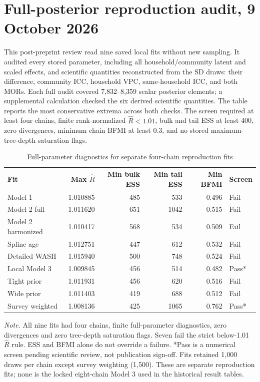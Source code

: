 \documentclass[10pt]{article}
\begin{document}
\section{Full-posterior reproduction audit, 9 October 2026}

This post-preprint review read nine saved local fits without new sampling. It audited every stored parameter, including all household/community latent and scaled effects, and scientific quantities reconstructed from the SD draws: their difference, community ICC, household VPC, same-household ICC, and both MORs. Each full audit covered 7,832--8,359 scalar posterior elements; a supplemental calculation checked the six derived scientific quantities. The table reports the most conservative extrema across both checks. The screen required at least four chains, finite rank-normalized $\hat R<1.01$, bulk and tail ESS at least 400, zero divergences, minimum chain BFMI at least 0.3, and no stored maximum-tree-depth saturation flags.

\begin{table}[H]
\centering
\caption{Full-parameter diagnostics for separate four-chain reproduction fits}
\label{tab:full_posterior_audit}
\small
\begin{tabular}{lrrrrl}
\toprule
Fit & Max $\hat R$ & Min bulk ESS & Min tail ESS & Min BFMI & Screen \\
\midrule
Model 1 & 1.010885 & 485 & 533 & 0.496 & Fail \\
Model 2 full & 1.011620 & 651 & 1042 & 0.515 & Fail \\
Model 2 harmonized & 1.010417 & 568 & 534 & 0.509 & Fail \\
Spline age & 1.012751 & 447 & 612 & 0.532 & Fail \\
Detailed WASH & 1.015940 & 500 & 748 & 0.524 & Fail \\
Local Model 3 & 1.009845 & 456 & 514 & 0.482 & Pass* \\
Tight prior & 1.011931 & 456 & 620 & 0.516 & Fail \\
Wide prior & 1.011403 & 419 & 688 & 0.512 & Fail \\
Survey weighted & 1.008136 & 425 & 1065 & 0.762 & Pass* \\
\bottomrule
\end{tabular}

\begin{minipage}{0.98\textwidth}
\footnotesize
\textit{Note.} All nine fits had four chains, finite full-parameter diagnostics, zero divergences and zero tree-depth saturation flags. Seven fail the strict below-1.01 $\hat R$ rule. ESS and BFMI alone do not override a failure. *Pass is a numerical screen pending scientific review, not publication sign-off. Fits retained 1,000 draws per chain except survey weighting (1,500). These are separate reproduction fits; none is the locked eight-chain Model 3 used in the historical result tables.
\end{minipage}
\end{table}
\end{document}
